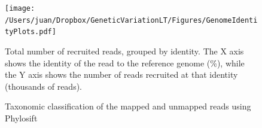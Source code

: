 \begin{figure}[!hbtp]
  \centering
  \texttt{[image: /Users/juan/Dropbox/GeneticVariationLT/Figures/GenomeIdentityPlots.pdf]}
  \caption{Total number of recruited reads, grouped by identity. The X axis shows the identity of the read to the reference genome (\%), while the Y axis shows the number of reads recruited at that identity (thousands of reads).}
  \label{GenomeReadIdentity}
\end{figure}


\begin{figure}[!hbtp]
\centering
{}
    \hfill
{}
    \caption{Taxonomic classification of the mapped and unmapped reads using Phylosift \cite{Darling:2014ej}}
    \label{Jan23_Tax}
\end{figure}

